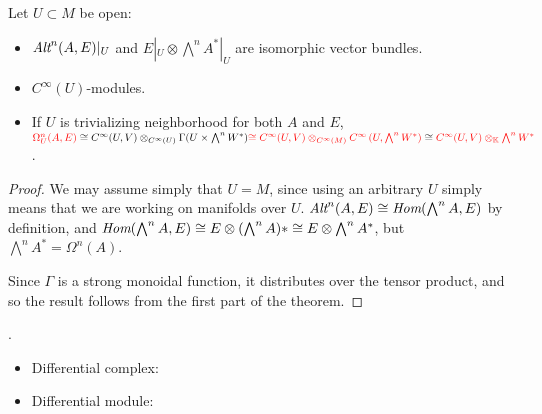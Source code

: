 \lin

\begin{theorem}\label{isomorphOmega}
Let $U\subset M$ be open:
    \begin{itemize}
    
    \item $\operatorname{\textit{Alt}}^n(A, E)|_U$ and $E|_U \otimes \bigwedge^n A^*|_U$ are isomorphic vector bundles.
    
    
    \item {} $C^\infty(U)$-modules.
    
    \item If $U$ is trivializing neighborhood for both $A$ and $E$, $\textcolor{red}{\Omega_U^n(A, E)} \cong C^\infty(U, V) \otimes_{C^\infty(U)} \Gamma(U \times \bigwedge^n W^*) \textcolor{red}{\cong C^\infty(U, V) \otimes_{C^\infty(M)} C^\infty\left(U, \bigwedge^n W^* \right) } \cong \textcolor{red}{ C^\infty(U, V) \otimes_{\mathbb{K}} \bigwedge^n W^*}$.
    
    
    \end{itemize}
\end{theorem}

\begin{proof}
We may assume simply that $U = M$, since using an arbitrary $U$ simply means that we are working on manifolds over $U$. $\operatorname{\textit{Alt}}^n(A, E) \cong \operatorname{\textit{Hom}}(\bigwedge^n A, E)$ by definition, and $\operatorname{\textit{Hom}}(\bigwedge^n A, E) \cong E \otimes (\bigwedge^n A)* \cong E \otimes \bigwedge^n A^*$, but $\bigwedge^n A^* = \Omega^n(A)$.

Since $\Gamma$ is a strong monoidal function, it distributes over the tensor product, and so the result follows from the first part of the theorem.
\end{proof}

\linea


.

\begin{definition}
    \begin{itemize}
    
    \item Differential complex:
    
    \item Differential module:
        
    \end{itemize}
\end{definition}


